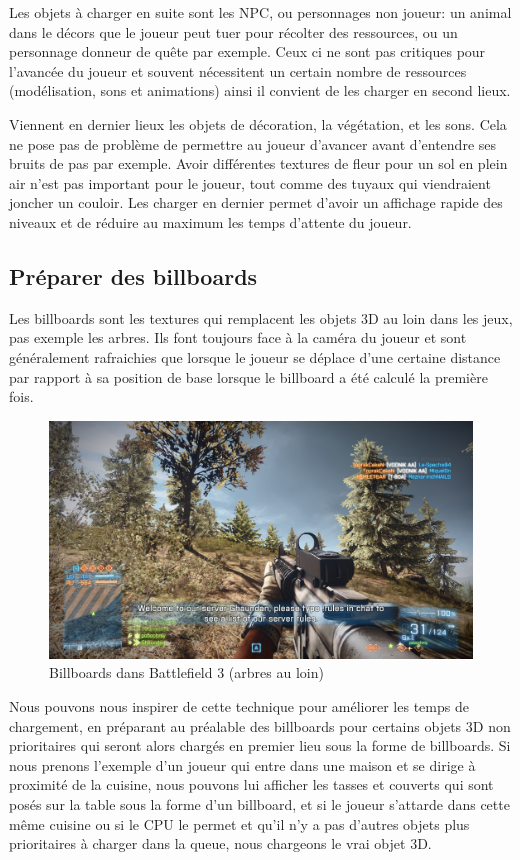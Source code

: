 \documentclass[a4paper, 11pt]{article} %
\begin{document}
Les objets à charger en suite sont les NPC, ou personnages non joueur: un animal dans le décors que le joueur peut tuer pour récolter des ressources, ou un personnage donneur de quête par exemple. Ceux ci ne sont pas critiques pour l'avancée du joueur et souvent nécessitent un certain nombre de ressources (modélisation, sons et animations) ainsi il convient de les charger en second lieux. 

Viennent en dernier lieux les objets de décoration, la végétation, et les sons. Cela ne pose pas de problème de permettre au joueur d'avancer avant d'entendre ses bruits de pas par exemple. Avoir différentes textures de fleur pour un sol en plein air n'est pas important pour le joueur, tout comme des tuyaux qui viendraient joncher un couloir. Les charger en dernier permet d'avoir un affichage rapide des niveaux et de réduire au maximum les temps d'attente du joueur.

\newpage
\subsection{Préparer des billboards}
Les billboards sont les textures qui remplacent les objets 3D au loin dans les jeux, pas exemple les arbres. Ils font toujours face à la caméra du joueur et sont généralement rafraichies que lorsque le joueur se déplace d'une certaine distance par rapport à sa position de base lorsque le billboard a été calculé la première fois. 

\begin{figure}[!h]%
\includegraphics[width=\columnwidth]{images/bf3_billboards.png}%
\caption{Billboards dans Battlefield 3 (arbres au loin)}%
\label{}%
\end{figure}

Nous pouvons nous inspirer de cette technique pour améliorer les temps de chargement, en préparant au préalable des billboards pour certains objets 3D non prioritaires qui seront alors chargés en premier lieu sous la forme de billboards. Si nous prenons l'exemple d'un joueur qui entre dans une maison et se dirige à proximité de la cuisine, nous pouvons lui afficher les tasses et couverts qui sont posés sur la table sous la forme d'un billboard, et si le joueur s'attarde dans cette même cuisine ou si le CPU le permet et qu'il n'y a pas d'autres objets plus prioritaires à charger dans la queue, nous chargeons le vrai objet 3D.
\end{document}
